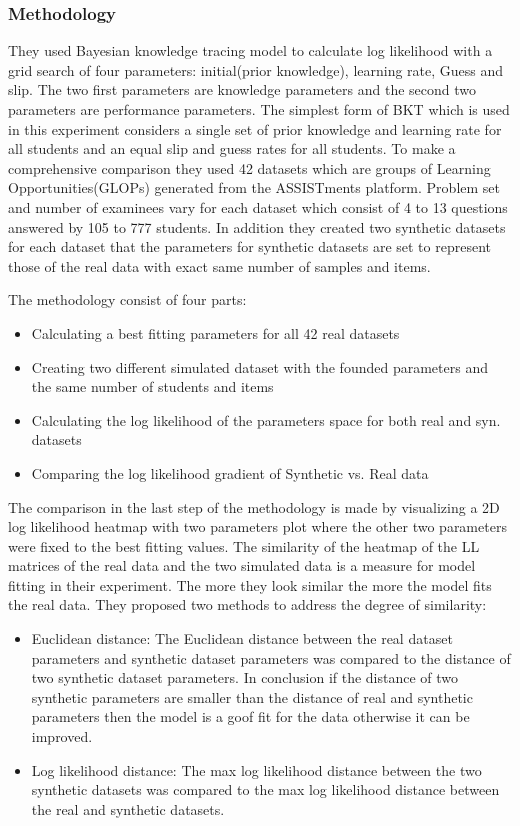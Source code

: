 \subsubsection{Methodology}
They used Bayesian knowledge tracing model to calculate log likelihood with a grid search of four parameters: initial(prior knowledge), learning rate, Guess and slip. The two first parameters are knowledge parameters and the second two parameters are performance parameters. The simplest form of BKT which is used in this experiment considers a single set of prior knowledge and  learning rate for all students and an equal slip and guess rates for all students.
To make a comprehensive comparison they used 42 datasets which are groups of Learning Opportunities(GLOPs) generated from the ASSISTments platform. Problem set and number of examinees vary for each dataset which consist of 4 to 13 questions answered by 105 to 777 students. In addition they created two synthetic datasets for each dataset that the parameters for synthetic datasets are set to represent those of the real data with exact same number of samples and items. 

The methodology consist of four parts:
\begin{itemize}
\item Calculating a best fitting parameters for all 42 real datasets
\item Creating two different simulated dataset with the founded parameters and the same number of students and items
\item Calculating the log likelihood of the parameters space for both real and syn. datasets
\item Comparing the log likelihood gradient of Synthetic vs. Real data
\end{itemize}

The comparison in the last step of the methodology is made by visualizing  a 2D log likelihood heatmap with two parameters plot where the other two parameters were fixed to the best fitting values. The similarity of the heatmap of the LL matrices of the real data and the two simulated data is a measure for model fitting in their experiment. The more they look similar the more the model fits the real data. They proposed two methods to address the degree of similarity:
\begin{itemize}
\item Euclidean distance: The Euclidean distance between the real dataset parameters and synthetic dataset parameters was compared to the distance of two synthetic dataset parameters. In conclusion if the distance of two synthetic parameters are smaller than the distance of real and synthetic parameters then the model is a goof fit for the data otherwise it can be improved.
\item Log likelihood distance: The max log likelihood distance between the two synthetic datasets was compared to the max log likelihood distance between the real and synthetic datasets. 
\end{itemize}
